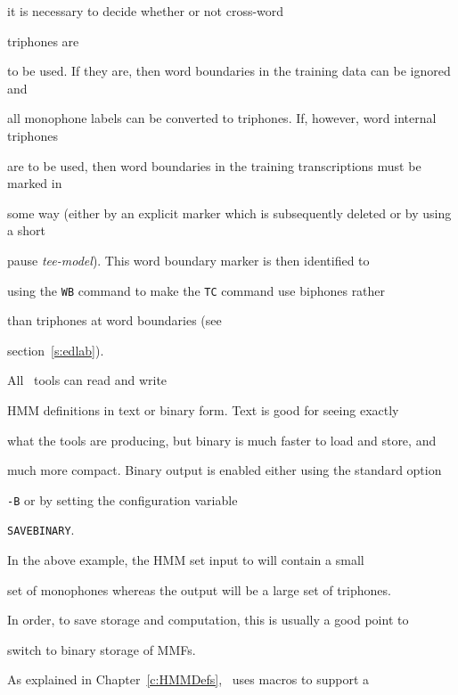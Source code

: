 it is necessary to decide whether or not cross-word 


triphones are


to be used.  If they are, then word boundaries in the training data can be ignored and


all monophone labels can be converted to triphones.  If, however, word internal triphones


are to be used, then word boundaries in the training transcriptions must be marked in


some way (either by an explicit marker which is subsequently deleted or by using a short


pause \textit{tee-model}).  This word boundary marker is then identified to 


using the \texttt{WB} command to make the \texttt{TC} command use biphones rather


than triphones at word boundaries (see


section~\ref{s:edlab}).





All \HTK\ tools can read and write


HMM definitions in text or binary form.  Text is good for seeing exactly


what the tools are producing, but binary is much faster to load and store, and


much more compact.  Binary output is enabled either using the standard option


\texttt{-B} or by setting the configuration variable 


\texttt{SAVEBINARY}.


In the above example, the HMM set input to  will contain a small


set of monophones whereas the output will be a large set of triphones.


In order, to save storage and computation, this is usually a good point to


switch to binary storage of MMFs. 










As explained in Chapter~\ref{c:HMMDefs}, \HTK\ uses macros to support a 


